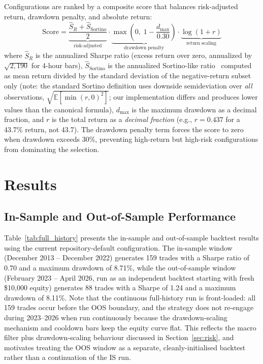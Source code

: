 \documentclass{article}
\newcommand{\E}{\mathbb{E}}
\begin{document}
Configurations are ranked by a composite score that balances risk-adjusted return, drawdown penalty, and absolute return:
\begin{equation}
  \text{Score} = \underbrace{\frac{\hat{S}_R + \hat{S}_{\text{Sortino}}}{2}}_{\text{risk-adjusted}} \cdot
  \underbrace{\max\!\left(0,\; 1 - \frac{d_{\max}}{0.30}\right)}_{\text{drawdown penalty}} \cdot
  \underbrace{\log(1 + r)}_{\text{return scaling}}
  \label{eq:score}
\end{equation}
where $\hat{S}_R$ is the annualized Sharpe ratio (excess return over zero, annualized by $\sqrt{2{,}190}$ for 4-hour bars), $\hat{S}_{\text{Sortino}}$ is the annualized Sortino-like ratio~\citep{sortino1991downside} computed as mean return divided by the standard deviation of the negative-return subset only (note: the standard Sortino definition uses downside semideviation over \emph{all} observations, $\sqrt{\E[\min(r,0)^2]}$; our implementation differs and produces lower values than the canonical formula), $d_{\max}$ is the maximum drawdown as a decimal fraction, and $r$ is the total return as a \emph{decimal fraction} (e.g., $r = 0.437$ for a 43.7\% return, not 43.7).
The drawdown penalty term forces the score to zero when drawdown exceeds 30\%, preventing high-return but high-risk configurations from dominating the selection.

\section{Results}
\label{sec:results}

\subsection{In-Sample and Out-of-Sample Performance}

Table~\ref{tab:full_history} presents the in-sample and out-of-sample backtest results using the current repository-default configuration.
The in-sample window (December 2013 -- December 2022) generates 159 trades with a Sharpe ratio of 0.70 and a maximum drawdown of 8.71\%, while the out-of-sample window (February 2023 -- April 2026, run as an independent backtest starting with fresh \$10,000 equity) generates 88 trades with a Sharpe of 1.24 and a maximum drawdown of 8.11\%.
Note that the continuous full-history run is front-loaded: all 159 trades occur before the OOS boundary, and the strategy does not re-engage during 2023--2026 when run continuously because the drawdown-scaling mechanism and cooldown bars keep the equity curve flat.
This reflects the macro filter plus drawdown-scaling behaviour discussed in Section~\ref{sec:risk}, and motivates treating the OOS window as a separate, cleanly-initialised backtest rather than a continuation of the IS run.
\end{document}
